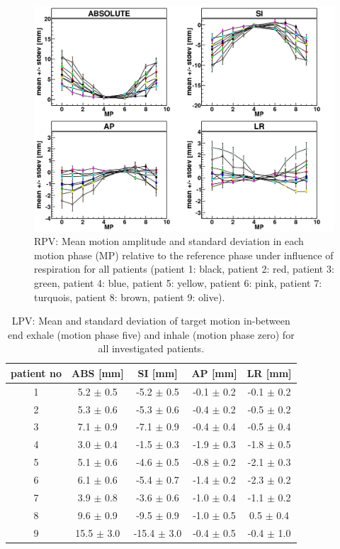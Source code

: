 \begin{figure}[H]
\begin{center}
 \includegraphics[scale=0.22]{./teile/results_mdacc/MDACC_allPatients_RESP_RPV.png}
\caption{RPV: Mean motion amplitude and standard deviation in each motion phase (MP) relative to the reference phase under influence of 
respiration for all patients (patient 1: black, patient 2: red, patient 3: green, patient 4: blue, patient 5: yellow, patient 6: pink, patient 
7: turquois, patient 8: brown, patient 9: olive). }
\label{motion_resp_all_rpv}
\end{center}
\end{figure}

\newpage

\begin{table}[htbp]
  \centering
  \caption{LPV: Mean and standard deviation of target motion in-between end exhale (motion phase five) and inhale (motion phase zero) for 
  all investigated patients.}
  \begin{tabular}{|c|c|c|c|c|}
    \hline\hline
    patient no & ABS [mm] & SI [mm] & AP [mm] & LR [mm]\\
    \hline
    1 & 5.2 $\pm$ 0.5 & -5.2 $\pm$ 0.5 & -0.1 $\pm$ 0.2 & -0.1 $\pm$ 0.2 \\
    2 & 5.3 $\pm$ 0.6 & -5.3 $\pm$ 0.6 & -0.4 $\pm$ 0.2 & -0.5 $\pm$ 0.2 \\
    3 & 7.1 $\pm$ 0.9 & -7.1 $\pm$ 0.9 & -0.4 $\pm$ 0.4 & -0.5 $\pm$ 0.4 \\
    4 & 3.0 $\pm$ 0.4 & -1.5 $\pm$ 0.3 & -1.9 $\pm$ 0.3 & -1.8 $\pm$ 0.5 \\
    5 & 5.1 $\pm$ 0.6 & -4.6 $\pm$ 0.5 & -0.8 $\pm$ 0.2 & -2.1 $\pm$ 0.3 \\
    6 & 6.1 $\pm$ 0.6 & -5.4 $\pm$ 0.7 & -1.4 $\pm$ 0.2 & -2.3 $\pm$ 0.2 \\
    7 & 3.9 $\pm$ 0.8 & -3.6 $\pm$ 0.6 & -1.0 $\pm$ 0.4 & -1.1 $\pm$ 0.2 \\
    8 & 9.6 $\pm$ 0.9 & -9.5 $\pm$ 0.9 & -1.0 $\pm$ 0.5 & 0.5 $\pm$ 0.4 \\
    9 & 15.5 $\pm$ 3.0 & -15.4 $\pm$ 3.0 & -0.4 $\pm$ 0.5 & -0.4 $\pm$ 1.0 \\
    \hline\hline
  \end{tabular}
  \label{tab:motion:LPV:mdacc}
\end{table}

